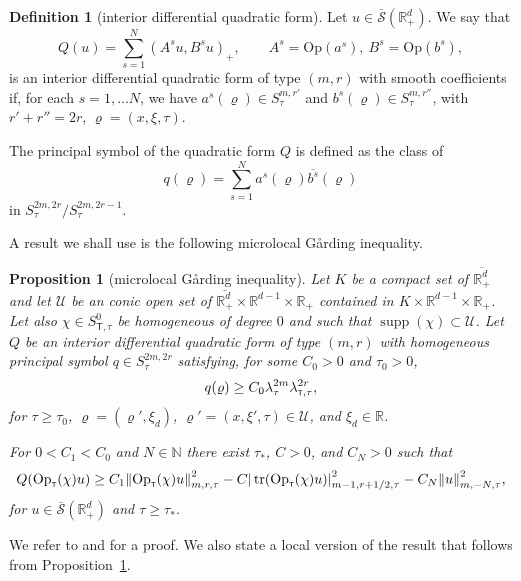 \documentclass[10pt]{amsart}
\theoremstyle{plain}
\newtheorem{proposition}[theorem]{Proposition}
\theoremstyle{definition}
\newtheorem{definition}[theorem]{Definition}
\def\R{\mathbb{R}}
\def\N{\mathbb{N}}
\let\y\varrho
\let \Re \relax
\DeclareMathOperator{\Re}{Re}
\newcommand{\ovl}[1]{\overline{#1}}
\newcommand{\inp}[2]{(#1, #2)}
\newcommand{\U}{\mathscr U}
\newcommand{\Op}{\ensuremath{\mathrm{Op}}}
\newcommand{\Opt}{\ensuremath{\mathrm{Op}_{\scriptscriptstyle{\mathsf{T}}}}}
\newcommand{\Normsc}[2]{{\| #1 \|}_{#2, \tau}}
\newcommand{\normsc}[2]{{| #1 |}_{#2, \tau}}
\newcommand{\lsc}{\lambda_\tau}
\newcommand{\lsct}{\lambda_{{\scriptscriptstyle{\mathsf T}},\tau}}
\newcommand{\Ssc}{S_\tau}
\newcommand{\Ssct}{S_{{\scriptscriptstyle{\mathsf T}},\tau}}
\newcommand{\Sbarp}{\ensuremath{\overline{\mathscr{S}}(\Rdp)}}
\newcommand{\Rdp}{\R^d_+}
\DeclareMathOperator{\supp}{supp}
\DeclareMathOperator{\trace}{tr}
\begin{document}
\begin{definition}[interior differential quadratic form]
\label{def: interior quadratic form}
Let $u\in \Sbarp$. We say that
\begin{equation}
\label{eq: quadratic form}
Q(u)=\sum_{s=1}^N\inp{A^su}{B^su}_+,
\qquad A^s = \Op(a^s), \
B^s= \Op(b^s),
\end{equation}
is an interior differential quadratic form of type $(m,r)$ with smooth
coefficients if, for each $s=1,\dots N$, we have $a^s(\y)\in
\Ssc^{m,r'}$ and $b^s(\y)\in
\Ssc^{m,r''}$, with $r' + r'' = 2
r$, $\y = (x,\xi,\tau)$.

The principal symbol of the quadratic form $Q$ is defined as the
class of
\begin{equation}
\label{eq: symbol quadratic form}
q(\y)=\sum_{s=1}^N a^{s}(\y)\ovl{b^s}(\y)
\end{equation}
in $\Ssc^{2m,2 r} / \Ssc^{2m,2 r-1}$.
\end{definition}
A result we shall use is the following microlocal G{\aa}rding inequality.

\begin{proposition}[microlocal G{\aa}rding inequality]
\label{prop: Gaarding quadratic forms}
Let $K$ be a compact set of $\ovl{\Rdp}$ and let
$\U$ be an conic open set of $\ovl{\Rdp} \times \R^{d-1} \times
\R_+$ contained in $K \times \R^{d-1} \times
\R_+$.
Let also $\chi \in \Ssct^0$ be homogeneous of degree $0$ and such
that
$\supp (\chi) \subset \U$. Let $Q$ be an interior differential quadratic
form of type $(m,r)$ with homogeneous
principal symbol $q\in \Ssc^{2m,2 r}$ satisfying, for some $C_0>0$
and $\tau_0>0$,
\begin{equation*}
\Re q(\y)\geq C_0 \lsc^{2m} \lsct^{2r},
\end{equation*}
for $\tau \geq \tau_0$, $\y = (\y',\xi_d)$,
$\y'=(x,\xi',\tau)\in\U$, and $\xi_d\in\R$.

For $0< C_1 < C_0$ and $N \in \N$ there exist $\tau_\ast$, $C>0$,
and $C_N>0$ such that
\begin{equation*}
\Re Q(\Opt(\chi) u)
\geq
C_1\Normsc{\Opt(\chi) u}{m,r}^2
-C\normsc{\trace(\Opt(\chi) u)}{m-1,r+1/2}^2- C_N \Normsc{u}{m,-N}^2,
\end{equation*}
for $u\in \Sbarp$ and $\tau\geq \tau_\ast$.
\end{proposition}
We refer to \cite[Prop.\,3.5]{ML} and \cite[Th.\,6.17]{JGL-vol2} for a proof.
We also state a local version of the result that follows from Proposition~\ref{prop: Gaarding quadratic forms}.
\end{document}
